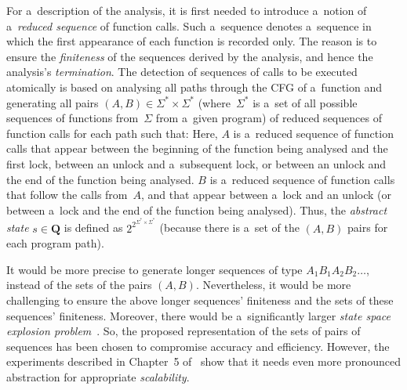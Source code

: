 For a~description of the analysis, it is first needed to introduce a~notion
of a~\emph{reduced sequence} of function calls. Such a~sequence denotes
a~sequence in which the first appearance of each function is recorded only.
The reason is to ensure the \emph{finiteness} of the sequences derived by the
analysis, and hence the analysis's \emph{termination}. The detection of
sequences of calls to be executed atomically is based on analysing all paths
through the CFG of a~function and generating all pairs $ {(A, B)} \in
{\Sigma^* \times \Sigma^*} $ (where~$ \Sigma^* $ is a~set of all possible
sequences of functions from~$ \Sigma $ from a~given program) of reduced
sequences of function calls for each path such
that: Here, $ A $ is a~reduced sequence of function calls that appear between
the beginning of the function being analysed and the first lock, between an
unlock and a~subsequent lock, or between an unlock and the end of the function
being analysed. $ B $ is a~reduced sequence of function calls that follow the
calls from~$ A $, and that appear between a~lock and an unlock (or between
a~lock and the end of the function being analysed). Thus, the \emph{abstract
state} $ s \in \boldsymbol{Q} $ is defined as $ 2^{2^{\Sigma^* \times
\Sigma^*}} $ (because there is a~set of the ${ (A, B) }$ pairs for each program
path).

It would be more precise to generate longer sequences of type ${ A_1 B_1 A_2
B_2 \ldots }$, instead of the sets of the pairs ${ (A, B) }$. Nevertheless,
it would be more challenging to ensure the above longer sequences' finiteness
and the sets of these sequences' finiteness. Moreover, there would be
a~significantly larger \emph{state space explosion problem}~\cite{stateExpl}.
So, the proposed representation of the sets of pairs of sequences has been
chosen to compromise accuracy and efficiency. However, the experiments
described in Chapter~5 of~\cite{harmimBP} show that it needs even more
pronounced abstraction for appropriate \emph{scalability}.

